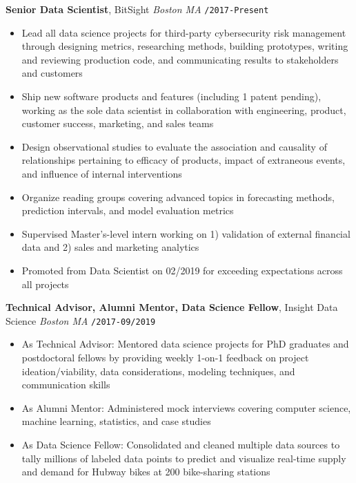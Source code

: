 \documentclass[10pt,english]{report}
\begin{document}
\textbf{Senior Data Scientist}, BitSight \hfill \textit{Boston MA} \texttt{/2017-Present}
\begin{itemize}
    \item Lead all data science projects for third-party cybersecurity risk management through designing metrics, researching methods, building prototypes, writing and reviewing production code, and communicating results to stakeholders and customers
    \item Ship new software products and features (including 1 patent pending), working as the sole data scientist in collaboration with engineering, product, customer success, marketing, and sales teams
    \item Design observational studies to evaluate the association and causality of relationships pertaining to efficacy of products, impact of extraneous events, and influence of internal interventions
    \item Organize reading groups covering advanced topics in forecasting methods, prediction intervals, and model evaluation metrics
    \item Supervised Master's-level intern working on 1) validation of external financial data and 2) sales and marketing analytics
    \item Promoted from Data Scientist on 02/2019 for exceeding expectations across all projects
\end{itemize}

\vspace{1mm}

\textbf{Technical Advisor, Alumni Mentor, Data Science Fellow}, Insight Data Science \hfill \textit{Boston MA} \texttt{/2017-09/2019}
\begin{itemize}
    \item As Technical Advisor: Mentored data science projects for PhD graduates and postdoctoral fellows by providing weekly 1-on-1 feedback on project ideation/viability, data considerations, modeling techniques, and communication skills
    \item As Alumni Mentor: Administered mock interviews covering computer science, machine learning, statistics, and case studies
    \item As Data Science Fellow: Consolidated and cleaned multiple data sources to tally millions of labeled data points to predict and visualize real-time supply and demand for Hubway bikes at 200 bike-sharing stations
\end{itemize}
\end{document}
